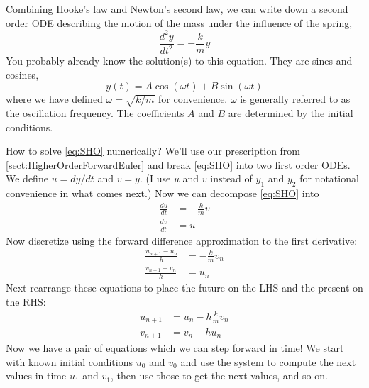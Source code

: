 \documentclass[hidelinks,notitlepage]{book}
\begin{document}
Combining Hooke's law and Newton's second law, we can write down a second order ODE describing the motion of the mass under the influence of the spring,
\begin{equation}
\label{eq:SHO}
\frac{d^2 y}{d t^2} = -\frac{k}{m} y
\end{equation}
You probably already know the solution(s) to this equation.  They are sines and cosines,
\begin{equation}
y(t) = A \cos(\omega t) + B \sin(\omega t)
\end{equation}
where we have defined $\omega = \sqrt{k/m}$ for convenience. $\omega$ is generally referred to as the oscillation frequency.  The coefficients $A$ and $B$ are determined by the initial conditions.

How to solve \cref{eq:SHO} numerically?  We'll use our prescription from \cref{sect:HigherOrderForwardEuler} and break \cref{eq:SHO} into two first order ODEs.  We define $u = dy/dt$ and $v = y$.  (I use $u$ and $v$ instead of $y_1$ and $y_2$ for notational convenience in what comes next.) Now we can decompose \cref{eq:SHO} into
\begin{equation}
\label{SHOSystem}
\begin{aligned}
\frac{d u}{d t} &= -\frac{k}{m} v  \\
\frac{d v}{d t} &= u
\end{aligned}
\end{equation}
Now discretize using the forward difference approximation to the first derivative:
\begin{align}
\nonumber
\frac{u_{n+1} - u_{n}}{h} &= -\frac{k}{m} v_n  \\
\nonumber
\frac{v_{n+1} - v_{n}}{h} &= u_n
\end{align}
Next rearrange these equations to place the future on the LHS and the present on the RHS:
\begin{equation}
\begin{aligned}
u_{n+1} &= u_n -h \frac{k}{m} v_n  \\
v_{n+1} &= v_n + h u_n
\end{aligned}
\label{eq:SHOSystem}
\end{equation}
Now we have a pair of equations which we can step forward in time!  We start with known initial conditions $u_0$  and $v_0$ and use the system to compute the next values in time $u_1$  and $v_1$, then use those to get the next values, and so on.
\end{document}
